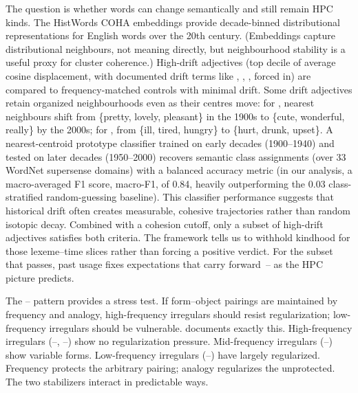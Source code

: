 The question is whether words can change semantically and still remain HPC kinds. The HistWords COHA embeddings \parencite{hamilton2016} provide decade-binned distributional representations for English words over the 20th century. (Embeddings capture distributional neighbours, not meaning directly, but neighbourhood stability is a useful proxy for cluster coherence.) High-drift adjectives (top decile of average cosine displacement, with documented drift terms like , , ,  forced in) are compared to frequency-matched controls with minimal drift. Some drift adjectives retain organized neighbourhoods even as their centres move: for , nearest neighbours shift from \{pretty, lovely, pleasant\} in the 1900s to \{cute, wonderful, really\} by the 2000s; for , from \{ill, tired, hungry\} to \{hurt, drunk, upset\}. A nearest-centroid prototype classifier trained on early decades (1900--1940) and tested on later decades (1950--2000) recovers semantic class assignments (over 33 WordNet supersense domains) with a balanced accuracy metric (in our analysis, a macro-averaged F1 score, macro-F1, of 0.84, heavily outperforming the 0.03 class-stratified random-guessing baseline). This classifier performance suggests that historical drift often creates measurable, cohesive trajectories rather than random isotopic decay. Combined with a cohesion cutoff, only a subset of high-drift adjectives satisfies both criteria. The framework tells us to withhold kindhood for those lexeme--time slices rather than forcing a positive verdict. For the subset that passes, past usage fixes expectations that carry forward~-- as the HPC picture predicts.

The -- pattern provides a stress test. If form--object pairings are maintained by frequency and analogy, high-frequency irregulars should resist regularization; low-frequency irregulars should be vulnerable. \textcite{bybee2001} documents exactly this. High-frequency irregulars (--, --) show no regularization pressure. Mid-frequency irregulars (--) show variable forms. Low-frequency irregulars (--) have largely regularized. Frequency protects the arbitrary pairing; analogy regularizes the unprotected. The two stabilizers interact in predictable ways.

